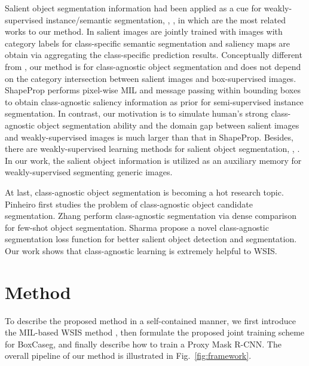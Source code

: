 \documentclass[final]{cvpr}
\begin{document}
Salient object segmentation information had been applied as a cue for weakly-supervised instance/semantic segmentation, \eg, \cite{huang2018weakly, fanECCV18GP, zeng2019joint, zhou2020learning}, in which \cite{zeng2019joint,zhou2020learning} are the most related works to our method. In \cite{zeng2019joint} salient images are jointly trained with images with category labels for class-specific semantic segmentation and saliency maps are obtain via aggregating the class-specific prediction results. Conceptually different from \cite{zeng2019joint}, our method is for class-agnostic object segmentation and does not depend on the category intersection between salient images and box-supervised images. ShapeProp \cite{zhou2020learning} performs pixel-wise MIL and message passing within bounding boxes to obtain class-agnostic saliency information as prior for semi-supervised instance segmentation. In contrast, our motivation is to simulate human’s strong class-agnostic object segmentation ability and the domain gap between salient images and weakly-supervised images is much larger than that in ShapeProp. Besides, there are weakly-supervised learning methods for salient object segmentation, \eg, \cite{li2018weakly,zeng2019multi,zhang2020weakly}. In our work, the salient object information is utilized as an auxiliary memory for weakly-supervised segmenting generic images.



At last, class-agnostic object segmentation is becoming a hot research topic. Pinheiro \etal \cite{pinheiro2015learning} first studies the problem of class-agnostic object candidate segmentation. Zhang \etal \cite{zhang2019canet} perform class-agnostic segmentation via dense comparison for few-shot object segmentation. Sharma \etal \cite{sharma2020class} propose a novel class-agnostic segmentation loss function for better salient object detection and segmentation. Our work shows that class-agnostic learning is extremely helpful to WSIS.






\vspace{-1mm}
\section{Method}
\vspace{-1mm}





To describe the proposed method in a self-contained manner, we first introduce the MIL-based WSIS method \cite{hsu2019weakly}, then formulate the proposed joint training scheme for BoxCaseg, and finally describe how to train a Proxy Mask R-CNN. The overall pipeline of our method is illustrated in Fig.~\ref{fig:framework}.
\end{document}
